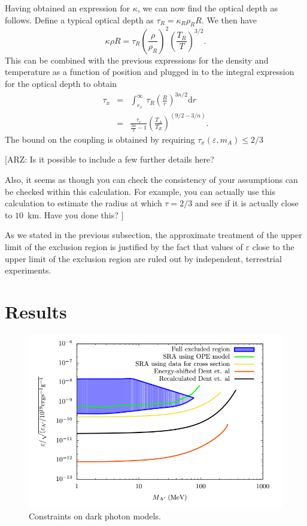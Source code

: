 \documentclass[nofootinbib,prd,superscriptaddress,twocolumn]{revtex4}
\newcommand{\beq}{\begin{equation}}
\newcommand{\eeq}{\end{equation}}
\newcommand{\bea}{\begin{eqnarray}}
\newcommand{\eea}{\end{eqnarray}}
\newcommand{\dd}{\mathrm{d}}
\newcommand{\arz}[1]{{{\bf{\color{BrickRed}[ARZ: #1]}}}}
\begin{document}
	
Having obtained an expression for $ \kappa $, we can now find the optical depth as follows. 
Define a typical optical depth as $\tau_R = \kappa_R \rho_R R $. We then have 
\beq 
\kappa \rho R = \tau_R \left( \frac{\rho}{\rho_R} \right)^2 \left( \frac{T_R}{T} \right)^{3/2}.
\eeq
%
This can be combined with the previous expressions for the density and temperature as a function of position 
and plugged in to the integral expression for the optical depth to obtain 
\bea 
\tau_x &=& \int_{r_x}^{\infty}\, \tau_R \left( \frac{R}{r} \right)^{3n/2} \dd r \\
 &=& \frac{\tau_r}{\frac{3n}{2}-1} \left( \frac{T_A}{T_R} \right)^{(9/2-3/n)}. 
 \eea
 The bound on the coupling is obtained by requiring  $ \tau_x(\varepsilon,m_A) \le 2/3 $
 \arz{Is it possible to include a few further details here? 
 
 Also, it seems as though you can check the consistency of your assumptions can 
 be checked within this calculation. For example, you can actually use this calculation 
 to estimate the radius at which $\tau=2/3$ and see if it is actually close to 
 $10$~km. Have you done this?
 }
 

As we stated in the previous subsection, the approximate treatment of the upper limit of the exclusion region 
is justified by the fact that values of $\varepsilon$ close to the upper limit of the exclusion region are 
ruled out by independent, terrestrial experiments.


\section{Results}
\label{section:results}



\begin{figure}[th]
\includegraphics[width=14cm]{constraint_edited.png}
\caption{
Constraints on dark photon models. 
}
\label{fig:constraints}
\end{figure}
\end{document}
